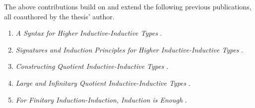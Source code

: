 \documentclass[12pt]{article}
\begin{document}
The above contributions build on and extend the following previous publications,
all coauthored by the thesis' author.
\begin{enumerate}
  \item \emph{A Syntax for Higher Inductive-Inductive Types} \cite{hiit}.
  \item \emph{Signatures and Induction Principles for Higher Inductive-Inductive Types} \cite{hiits}.
  \item \emph{Constructing Quotient Inductive-Inductive Types} \cite{kaposi2019constructing}.
  \item \emph{Large and Infinitary Quotient Inductive-Inductive Types} \cite{iqiit}.
  \item \emph{For Finitary Induction-Induction, Induction is Enough} \cite{ind-ind-reduction}.
\end{enumerate}





\end{document}
